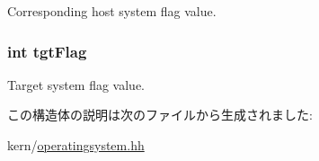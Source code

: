 Corresponding host system flag value. \hypertarget{structOpenFlagTransTable_a687b99b778abecb07804f5f12764d034}{
\subsubsection[{tgtFlag}]{\setlength{\rightskip}{0pt plus 5cm}int {\bf tgtFlag}}}
\label{structOpenFlagTransTable_a687b99b778abecb07804f5f12764d034}


Target system flag value. 

この構造体の説明は次のファイルから生成されました:\begin{DoxyCompactItemize}
\item 
kern/\hyperlink{operatingsystem_8hh}{operatingsystem.hh}\end{DoxyCompactItemize}

